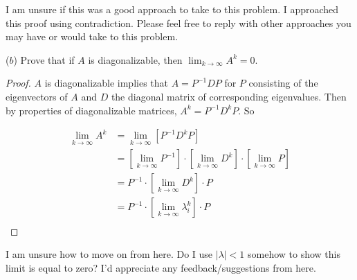 \documentclass[12pt]{article}
\begin{document}
\color{red} I am unsure if this was a good approach to take to this problem. I approached this proof using contradiction. Please feel free to reply with other approaches you may have or would take to this problem.

\vspace{.2cm}

\color{black}\begin{flushleft} ($b$) Prove that if $A$ is diagonalizable, then $\lim_{k \to \infty} A^{k}=0$. 

\vspace{.2cm}

\begin{proof} $A$ is diagonalizable implies that $A=P^{-1}DP$ for $P$ consisting of the eigenvectors of $A$ and $D$ the diagonal matrix of corresponding eigenvalues. Then by properties of diagonalizable matrices, $A^{k}=P^{-1}D^{k}P$. So

\begin{align*}
 \lim_{k \to \infty} A^{k}  &= \lim_{k \to \infty} [P^{-1}D^{k}P] \\
				  &=[ \lim_{k \to \infty} P^{-1} ] \cdot [ \lim_{k \to \infty} D^{k} ] \cdot [ \lim_{k \to \infty} P ] \\
				  &=P^{-1} \cdot [ \lim_{k \to \infty} D^{k} ] \cdot P \\
				  &=P^{-1} \cdot [ \lim_{k \to \infty} \lambda_{i}^{k} ] \cdot P \\
\end{align*}

\end{proof}
\end{flushleft}
 
\color{red} I am unsure how to move on from here. Do I use $|\lambda| < 1$ somehow to show this limit is equal to zero? I'd appreciate any feedback/suggestions from here. 

\vspace{.2cm}

\color{black}
\end{document}
